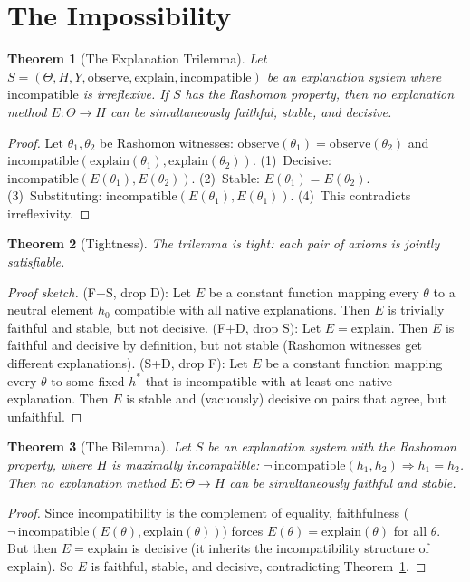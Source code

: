 \documentclass{article}
\newtheorem{theorem}{Theorem}
\begin{document}
\section{The Impossibility}
\label{sec:impossibility}

\begin{theorem}[The Explanation Trilemma]
\label{thm:trilemma}
Let $S = (\Theta, H, Y, \mathrm{observe}, \mathrm{explain},
\mathrm{incompatible})$ be an explanation system where
$\mathrm{incompatible}$ is irreflexive.
If $S$ has the Rashomon property, then no explanation method
$E : \Theta \to H$ can be simultaneously faithful, stable, and decisive.
\end{theorem}

\begin{proof}
Let $\theta_1, \theta_2$ be Rashomon witnesses:
$\mathrm{observe}(\theta_1) = \mathrm{observe}(\theta_2)$ and
$\mathrm{incompatible}(\mathrm{explain}(\theta_1),
\mathrm{explain}(\theta_2))$.
(1)~Decisive: $\mathrm{incompatible}(E(\theta_1), E(\theta_2))$.
(2)~Stable: $E(\theta_1) = E(\theta_2)$.
(3)~Substituting: $\mathrm{incompatible}(E(\theta_1), E(\theta_1))$.
(4)~This contradicts irreflexivity.
\end{proof}

\begin{theorem}[Tightness]
\label{thm:tightness}
The trilemma is tight: each pair of axioms is jointly satisfiable.
\end{theorem}
\begin{proof}[Proof sketch]
(F+S, drop D): Let $E$ be a constant function mapping every $\theta$ to a
  neutral element $h_0$ compatible with all native explanations. Then $E$ is
  trivially faithful and stable, but not decisive.
(F+D, drop S): Let $E = \mathrm{explain}$. Then $E$ is faithful and
  decisive by definition, but not stable (Rashomon witnesses get different
  explanations).
(S+D, drop F): Let $E$ be a constant function mapping every $\theta$ to
  some fixed $h^*$ that is incompatible with at least one native
  explanation. Then $E$ is stable and (vacuously) decisive on pairs that
  agree, but unfaithful.
\end{proof}

\begin{theorem}[The Bilemma]
\label{thm:bilemma}
Let $S$ be an explanation system with the Rashomon property, where $H$ is
\emph{maximally incompatible}: $\neg\,\mathrm{incompatible}(h_1, h_2)
\Rightarrow h_1 = h_2$.
Then no explanation method $E : \Theta \to H$ can be simultaneously
faithful and stable.
\end{theorem}
\begin{proof}
Since incompatibility is the complement of equality, faithfulness
($\neg\,\mathrm{incompatible}(E(\theta), \mathrm{explain}(\theta))$)
forces $E(\theta) = \mathrm{explain}(\theta)$ for all $\theta$.
But then $E = \mathrm{explain}$ is decisive (it inherits the
incompatibility structure of $\mathrm{explain}$).
So $E$ is faithful, stable, and decisive, contradicting
Theorem~\ref{thm:trilemma}.
\end{proof}
\end{document}
